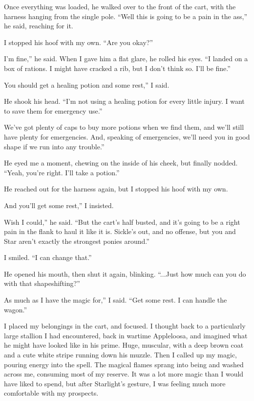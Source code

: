 Once everything was loaded, he walked over to the front of the cart, with the harness hanging from the single pole. “Well this is going to be a pain in the ass,” he said, reaching for it.

I stopped his hoof with my own. “Are you okay?”

\leavevmode{}I’m fine,” he said. When I gave him a flat glare, he rolled his eyes. “I landed on a box of rations. I might have cracked a rib, but I don’t think so. I’ll be fine.”

\leavevmode{}You should get a healing potion and some rest,” I said.

He shook his head. “I’m not using a healing potion for every little injury. I want to save them for emergency use.”

\leavevmode{}We’ve got plenty of caps to buy more potions when we find them, and we’ll still have plenty for emergencies. And, speaking of emergencies, we’ll need you in good shape if we run into any trouble.”

He eyed me a moment, chewing on the inside of his cheek, but finally nodded. “Yeah, you’re right. I’ll take a potion.”

He reached out for the harness again, but I stopped his hoof with my own.

\leavevmode{}And you’ll get some rest,” I insisted.

\leavevmode{}Wish I could,” he said. “But the cart’s half busted, and it’s going to be a right pain in the flank to haul it like it is. Sickle’s out, and no offense, but you and Star aren’t exactly the strongest ponies around.”

I smiled. “I can change that.”

He opened his mouth, then shut it again, blinking. “...Just how much can you do with that shapeshifting?”

\leavevmode{}As much as I have the magic for,” I said. “Get some rest. I can handle the wagon.”

I placed my belongings in the cart, and focused. I thought back to a particularly large stallion I had encountered, back in wartime Appleloosa, and imagined what he might have looked like in his prime. Huge, muscular, with a deep brown coat and a cute white stripe running down his muzzle. Then I called up my magic, pouring energy into the spell. The magical flames sprang into being and washed across me, consuming most of my reserve. It was a lot more magic than I would have liked to spend, but after Starlight’s gesture, I was feeling much more comfortable with my prospects.

